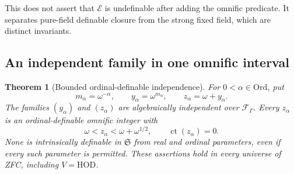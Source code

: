 \documentclass[11pt,a4paper]{article}
\numberwithin{equation}{section}
\newtheorem{theorem}{Theorem}[section]
\theoremstyle{definition}
\theoremstyle{remark}
\newcommand{\Ord}{\mathrm{Ord}}
\begin{document}
This does not assert that \(\mathcal E\) is undefinable after adding the
omnific predicate. It separates pure-field definable closure from
the strong fixed field, which are distinct invariants.

\subsection{An independent family in one omnific interval}

\begin{theorem}[Bounded ordinal-definable independence]
\label{dsn:rp:thm:independence}
For \(0<\alpha\in\Ord\), put
\[
 m_\alpha=\omega^{-\alpha},\qquad
 y_\alpha=\omega^{m_\alpha},\qquad z_\alpha=\omega+y_\alpha.
\]
The families \((y_\alpha)\) and \((z_\alpha)\) are algebraically
independent over \(\mathcal F_\Gamma\).
Every \(z_\alpha\) is an ordinal-definable omnific integer with
\[
 \omega<z_\alpha<\omega+\omega^{1/2},\qquad
 \operatorname{ct}(z_\alpha)=0.
\]
None is intrinsically definable in \(\mathfrak S\) from real and
ordinal parameters, even if every such parameter is permitted.
These assertions hold in every universe of ZFC, including
\(V=\mathrm{HOD}\).
\end{theorem}
\end{document}
